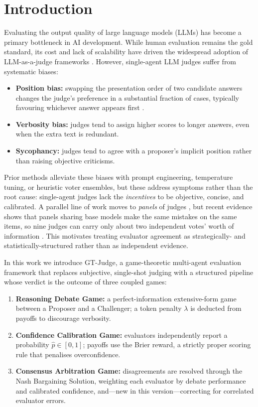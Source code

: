 \documentclass[11pt]{article}
\begin{document}
\section{Introduction}
Evaluating the output quality of large language models (LLMs) has become a
primary bottleneck in AI development. While human evaluation remains the gold
standard, its cost and lack of scalability have driven the widespread adoption
of LLM-as-a-judge frameworks \citep{zheng2023}. However, single-agent LLM
judges suffer from systematic biases:
\begin{itemize}[leftmargin=1.4em]
  \item \textbf{Position bias:} swapping the presentation order of two candidate
  answers changes the judge's preference in a substantial fraction of cases,
  typically favouring whichever answer appears first \citep{zheng2023}.
  \item \textbf{Verbosity bias:} judges tend to assign higher scores to longer
  answers, even when the extra text is redundant.
  \item \textbf{Sycophancy:} judges tend to agree with a proposer's implicit
  position rather than raising objective criticisms.
\end{itemize}

Prior methods alleviate these biases with prompt engineering, temperature
tuning, or heuristic voter ensembles, but these address symptoms rather than
the root cause: single-agent judges lack the \emph{incentives} to be objective,
concise, and calibrated. A parallel line of work moves to \emph{panels} of
judges \citep{verga2024}, but recent evidence shows that panels sharing base
models make the same mistakes on the same items, so nine judges can carry only
about two independent votes' worth of information \citep{kohli2026}. This
motivates treating evaluator agreement as strategically- and
statistically-structured rather than as independent evidence.

In this work we introduce GT-Judge, a game-theoretic multi-agent evaluation
framework that replaces subjective, single-shot judging with a structured
pipeline whose verdict is the outcome of three coupled games:
\begin{enumerate}[leftmargin=1.6em]
  \item \textbf{Reasoning Debate Game:} a perfect-information extensive-form
  game between a Proposer and a Challenger; a token penalty $\lambda$ is
  deducted from payoffs to discourage verbosity.
  \item \textbf{Confidence Calibration Game:} evaluators independently report a
  probability $\hat{p}\in[0,1]$; payoffs use the Brier reward, a strictly proper
  scoring rule that penalises overconfidence.
  \item \textbf{Consensus Arbitration Game:} disagreements are resolved through
  the Nash Bargaining Solution, weighting each evaluator by debate performance
  and calibrated confidence, and---new in this version---correcting for
  correlated evaluator errors.
\end{enumerate}
\end{document}
